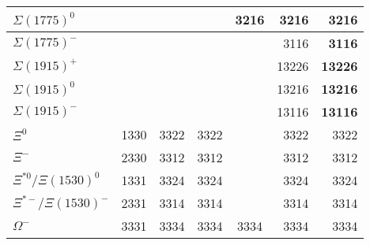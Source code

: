 \begin{tabular}{|l@{\tstrut}|r|r|r|c|r|r|}
$\Sigma(1775)^0$         &   &  &  &  3216 &  3216 & \bf{3216} \\ \hline
$\Sigma(1775)^-$         &   &  &  &       &  3116 & \bf{3116} \\ \hline
$\Sigma(1915)^+$         &   &  &  &       & 13226 & \bf{13226} \\ \hline
$\Sigma(1915)^0$         &   &  &  &       & 13216 & \bf{13216} \\ \hline
$\Sigma(1915)^-$         &   &  &  &       & 13116 & \bf{13116} \\ \hline
$\Xi^0$                      &  1330 & 3322 & 3322 &      &  3322 & 3322 \\ \hline
$\Xi^-$                      &  2330 & 3312 & 3312 &      &  3312 & 3312 \\ \hline
$\Xi^{*0}/\Xi(1530)^0$       &  1331 & 3324 & 3324 &      &  3324 & 3324 \\ \hline
$\Xi^{*-}/\Xi(1530)^-$       &  2331 & 3314 & 3314 &      &  3314 & 3314 \\ \hline
$\Omega^-$                   &  3331 & 3334 & 3334 & 3334 &  3334 & 3334 \\ \hline
\end{tabular}


